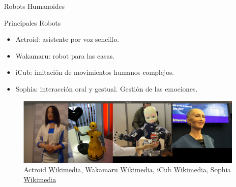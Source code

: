 \begin{frame}[fragile]{Robots Humanoides}
\vspace{10px}
\pause
{}
\begin{block}{Principales Robots}
	\begin{itemize}
		\item Actroid: asistente por voz sencillo.
		\pause
		\item Wakamaru: robot para las casas.
		\pause
		\item iCub: imitación de movimientos humanos complejos.
		\pause
		\item Sophia: interacción oral y gestual. Gestión de las emociones.
	\end{itemize}
\end{block}
\begin{figure}
	\centering
	\pause
	\includegraphics[scale=0.12]{./EtapaModerna/Imagenes/robots_humanoides.png}
	\caption{Actroid \href{https://commons.wikimedia.org/wiki/File:Actroid_3.jpg}{Wikimedia}, Wakamaru \href{https://commons.wikimedia.org/wiki/File:Wakamaru-fullshot2011.jpg}{Wikimedia}, iCub \href{https://commons.wikimedia.org/wiki/File:ICub_Innorobo_Lyon_2014.JPG}{Wikimedia}, Sophia \href{https://es.wikipedia.org/wiki/Archivo:Sophia_(robot).jpg}{Wikimedia}}
\end{figure}
\end{frame}